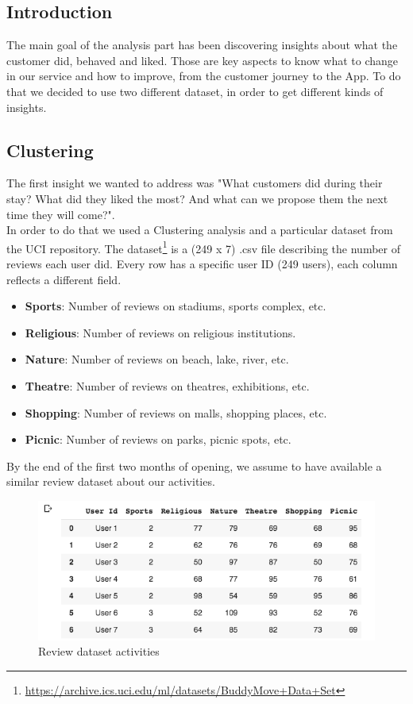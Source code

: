 \subsection{Introduction}
The main goal of the analysis part has been discovering insights about what the customer did, behaved and liked. Those are key aspects to know what to change in our service and how to improve, from the customer journey to the App. 
To do that we decided to use two different dataset, in order to get different kinds of insights.

\subsection{Clustering}
The first insight we wanted to address was "What customers did during their stay? What did they liked the most? And what can we propose them the next time they will come?".\\
In order to do that we used a Clustering analysis and a particular dataset from the UCI repository. The dataset\footnote{\url{https://archive.ics.uci.edu/ml/datasets/BuddyMove+Data+Set}} is a (249 x 7) .csv file describing the number of reviews each user did. Every row has a specific user ID (249 users), each column reflects  a different field.

\begin{itemize}
\item \textbf{Sports}: Number of reviews on stadiums, sports complex, etc.
\item \textbf{Religious}: Number of reviews on religious institutions.
\item \textbf{Nature}: Number of reviews on beach, lake, river, etc.
\item \textbf{Theatre}: Number of reviews on theatres, exhibitions, etc.
\item \textbf{Shopping}: Number of reviews on malls, shopping places, etc.
\item \textbf{Picnic}: Number of reviews on parks, picnic spots, etc.
\end{itemize}
\noindent By the end of the first two months of opening, we assume to have available a similar review dataset about our activities.

\begin{figure}[H]
\centering
\includegraphics[width=1\textwidth]{Img/Review_dataset.png}
\caption{Review dataset activities}
\end{figure}

